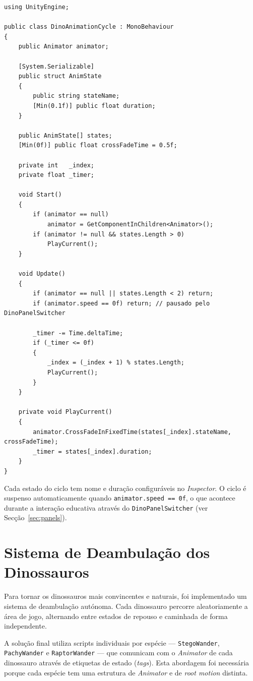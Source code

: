 \documentclass[a4paper,11pt]{report}
\newcommand{\code}[1]{\texttt{#1}}
\begin{document}
\begin{lstlisting}[caption={Excerto de DinoAnimationCycle.cs --- ciclo de animação.},
                   label={lst:animcycle}]
using UnityEngine;

public class DinoAnimationCycle : MonoBehaviour
{
    public Animator animator;

    [System.Serializable]
    public struct AnimState
    {
        public string stateName;
        [Min(0.1f)] public float duration;
    }

    public AnimState[] states;
    [Min(0f)] public float crossFadeTime = 0.5f;

    private int   _index;
    private float _timer;

    void Start()
    {
        if (animator == null)
            animator = GetComponentInChildren<Animator>();
        if (animator != null && states.Length > 0)
            PlayCurrent();
    }

    void Update()
    {
        if (animator == null || states.Length < 2) return;
        if (animator.speed == 0f) return; // pausado pelo DinoPanelSwitcher

        _timer -= Time.deltaTime;
        if (_timer <= 0f)
        {
            _index = (_index + 1) % states.Length;
            PlayCurrent();
        }
    }

    private void PlayCurrent()
    {
        animator.CrossFadeInFixedTime(states[_index].stateName, crossFadeTime);
        _timer = states[_index].duration;
    }
}
\end{lstlisting}

Cada estado do ciclo tem nome e duração configuráveis no \textit{Inspector}.
O ciclo é suspenso automaticamente quando \code{animator.speed == 0f}, o que
acontece durante a interação educativa através do \code{DinoPanelSwitcher}
(ver Secção~\ref{sec:panels}).

\section{Sistema de Deambulação dos Dinossauros}
\label{sec:wander}

Para tornar os dinossauros mais convincentes e naturais, foi implementado um
sistema de deambulação autónoma. Cada dinossauro percorre aleatoriamente a área
de jogo, alternando entre estados de repouso e caminhada de forma independente.

A solução final utiliza scripts individuais por espécie --- \code{StegoWander},
\code{PachyWander} e \code{RaptorWander} --- que comunicam com o \textit{Animator}
de cada dinossauro através de etiquetas de estado (\textit{tags}). Esta abordagem
foi necessária porque cada espécie tem uma estrutura de \textit{Animator} e de
\textit{root motion} distinta.
\end{document}
